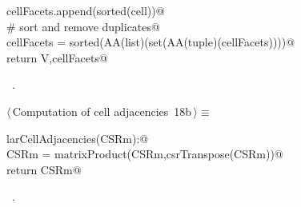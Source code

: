 \documentclass[11pt,oneside]{article}    %
\begin{document}
\begin{flushleft}
\begin{list}{}{}
\mbox{}\verb@                cellFacets.append(sorted(cell))@\\
\mbox{}\verb@    # sort and remove duplicates@\\
\mbox{}\verb@    cellFacets = sorted(AA(list)(set(AA(tuple)(cellFacets))))@\\
\mbox{}\verb@    return V,cellFacets@\\
\mbox{}\verb@@{\NWsep}
\end{list}
\vspace{-1ex}
\footnotesize\addtolength{\baselineskip}{-1ex}
\begin{list}{}{\setlength{\itemsep}{-\parsep}\setlength{\itemindent}{-\leftmargin}}
\item \NWtxtMacroRefIn\ .
\end{list}
\end{flushleft}



\begin{flushleft} \small \label{scrap29}
\protect{}$\langle\,$Computation of cell adjacencies\nobreak\ {\footnotesize 18b}$\,\rangle\equiv$
\vspace{-1ex}
\begin{list}{}{} \item
\mbox{}\verb@def larCellAdjacencies(CSRm):@\\
\mbox{}\verb@    CSRm = matrixProduct(CSRm,csrTranspose(CSRm))@\\
\mbox{}\verb@    return CSRm@\\
\mbox{}\verb@@{\NWsep}
\end{list}
\vspace{-1ex}
\footnotesize\addtolength{\baselineskip}{-1ex}
\begin{list}{}{\setlength{\itemsep}{-\parsep}\setlength{\itemindent}{-\leftmargin}}
\item \NWtxtMacroRefIn\ .
\end{list}
\end{flushleft}
\end{document}
